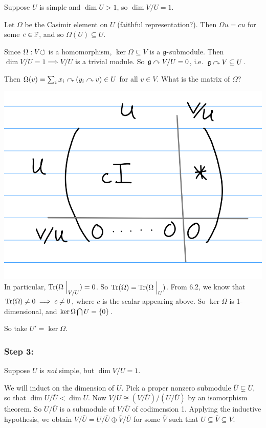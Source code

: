 Suppose \(U\) is simple and \(\dim U > 1\), so \(\dim V / U = 1\).

Let \(\Omega\) be the Casimir element on \(U\) (faithful
representation?). Then \(\Omega u = c u\) for some \(c \in {\mathbb{F}}\), and so
\(\Omega(U) \subseteq U\).

Since \(\Omega: V {\circlearrowleft}\) is a homomorphism,
\(\ker \Omega \subseteq V\) is a \({\mathfrak{g}}{\hbox{-}}\)submodule. Then
\(\dim V / U = 1 \implies V/U\) is a trivial module. So
\({\mathfrak{g}} \curvearrowright V/U = 0\), i.e.~\({\mathfrak{g}} \curvearrowright V \subseteq U\).

Then \(\Omega(v) = \sum_i x_i \curvearrowright (y_i \curvearrowright v) \in U\) for all
\(v\in V\). What is the matrix of \(\Omega\)?

\includegraphics{figures/2019-09-16-09:31.png}\\

In particular, \(\mathrm{Tr}(\Omega \mathrel{\Big|}_{V/U}) = 0\). So
\(\mathrm{Tr}(\Omega) = \mathrm{Tr}(\Omega\mathrel{\Big|}_U)\). From 6.2, we know that
\(\mathrm{Tr}(\Omega) \neq 0 \implies c\neq 0\), where \(c\) is the scalar
appearing above. So \(\ker \Omega\) is 1-dimensional, and
\(\ker \Omega \bigcap U = \left\{{0}\right\}\).

So take \(U' = \ker \Omega\).

\hypertarget{step-3}{%
\subsubsection{Step 3:}\label{step-3}}

Suppose \(U\) is \emph{not} simple, but \(\dim V/U = 1\).

We will induct on the dimension of \(U\). Pick a proper nonzero
submodule \(\overline U \subsetneq U\), so that
\(\dim U / \overline U < \dim U\). Now
\(V/U \cong (V / \overline U) / (U / \overline U)\) by an isomorphism
theorem. So \(U / \overline U\) is a submodule of \(V/\overline U\) of
codimension 1. Applying the inductive hypothesis, we obtain
\(V / \overline U = U / \overline U \oplus \overline V / \overline U\)
for some \(\overline V\) such that
\(U \subseteq \overline V \subseteq V\).

